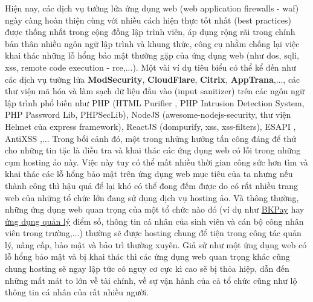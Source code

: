Hiện nay, các dịch vụ tường lửa ứng dụng web (web application firewalls - \acrshort{waf}) ngày càng hoàn thiện cùng với nhiều cách hiện thực tốt nhất (best practices) được thống nhất trong cộng đồng lập trình viên, áp dụng rộng rãi trong chính bản thân nhiều ngôn ngữ lập trình và khung thức, công cụ nhằm chống lại việc khai thác những lỗ hổng bảo mật thường gặp của ứng dụng web (như \acrshort{dos}, \acrshort{sqli}, \acrshort{xss}, remote code execution - \acrshort{rce},...). Một vài ví dụ tiêu biểu có thể kể đến như các dịch vụ tường lửa \textbf{ModSecurity}, \textbf{CloudFlare}, \textbf{Citrix}, \textbf{AppTrana},..., các thư viện mã hóa và làm sạch dữ liệu đầu vào (input sanitizer) trên các ngôn ngữ lập trình phổ biến như PHP (HTML Purifier \parencite{htmlpurifier}, PHP Intrusion Detection System, PHP Password Lib, PHPSecLib), NodeJS (awesome-nodejs-security, thư viện Helmet của express framework), ReactJS (dompurify, xss, xss-filters), ESAPI \parencite{esapi}, AntiXSS \parencite{antiXSS},... Trong bối cảnh đó, một trong những hướng tấn công đáng để thử cho những tin tặc là điều tra và khai thác các ứng dụng web có lỗi trong những cụm hosting ảo này. Việc này tuy có thể mất nhiều thời gian công sức hơn tìm và khai thác các lỗ hổng bảo mật trên ứng dụng web mục tiêu của ta nhưng nếu thành công thì hậu quả để lại khó có thể đong đếm được do có rất nhiều trang web của những tổ chức lớn đang sử dụng dịch vụ hosting ảo. Và thông thường, những ứng dụng web quan trọng của một tổ chức nào đó (ví dụ như \href{https://bkpay.hcmut.edu.vn/bkpay/home.action}{BKPay} hay \href{https://mybk.hcmut.edu.vn/stinfo/}{ứng dụng quản lý} điểm số, thông tin cá nhân của sinh viên và cán bộ công nhân viên trong trường,...) thường sẽ được hosting chung để tiện trong công tác quản lý, nâng cấp, bảo mật và bảo trì thường xuyên. Giả sử như một ứng dụng web có lỗ hổng bảo mật và bị khai thác thì các ứng dụng web quan trọng khác cũng chung hosting sẽ ngay lập tức có nguy cơ cực kì cao sẽ bị thỏa hiệp, dẫn đến những mất mát to lớn về tài chính, về sự vận hành của cả tổ chức cũng như lộ thông tin cá nhân của rất nhiều người. \par
